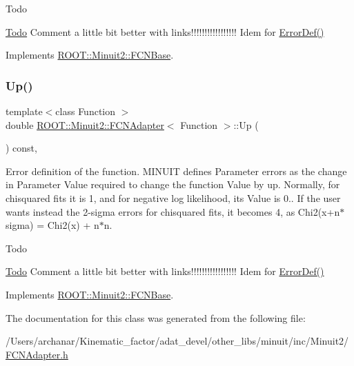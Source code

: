 \begin{DoxyRefDesc}{Todo}
\item[\mbox{\hyperlink{todo__todo000001}{Todo}}]Comment a little bit better with links!!!!!!!!!!!!!!!!! Idem for \mbox{\hyperlink{classROOT_1_1Minuit2_1_1FCNBase_ac4592475c58a65b037ba97ab5f3cba10}{Error\+Def()}}\end{DoxyRefDesc}


Implements \mbox{\hyperlink{classROOT_1_1Minuit2_1_1FCNBase_a04ef08ddad92ce8d89d498efbe021c39}{R\+O\+O\+T\+::\+Minuit2\+::\+F\+C\+N\+Base}}.

\mbox{\label{classROOT_1_1Minuit2_1_1FCNAdapter_a3bcb29efda3b97c17bb17512c1629365}} 
\subsubsection{\texorpdfstring{Up()}{Up()}\hspace{0.1cm}{\footnotesize\ttfamily [2/2]}}
{\footnotesize\ttfamily template$<$class Function $>$ \\
double \mbox{\hyperlink{classROOT_1_1Minuit2_1_1FCNAdapter}{R\+O\+O\+T\+::\+Minuit2\+::\+F\+C\+N\+Adapter}}$<$ Function $>$\+::Up (\begin{DoxyParamCaption}{ }\end{DoxyParamCaption}) const\hspace{0.3cm}{\ttfamily [inline]}, {\ttfamily [virtual]}}

Error definition of the function. M\+I\+N\+U\+IT defines Parameter errors as the change in Parameter Value required to change the function Value by up. Normally, for chisquared fits it is 1, and for negative log likelihood, its Value is 0.. If the user wants instead the 2-\/sigma errors for chisquared fits, it becomes 4, as Chi2(x+n$\ast$sigma) = Chi2(x) + n$\ast$n.

\begin{DoxyRefDesc}{Todo}
\item[\mbox{\hyperlink{todo__todo000001}{Todo}}]Comment a little bit better with links!!!!!!!!!!!!!!!!! Idem for \mbox{\hyperlink{classROOT_1_1Minuit2_1_1FCNBase_ac4592475c58a65b037ba97ab5f3cba10}{Error\+Def()}}\end{DoxyRefDesc}


Implements \mbox{\hyperlink{classROOT_1_1Minuit2_1_1FCNBase_a04ef08ddad92ce8d89d498efbe021c39}{R\+O\+O\+T\+::\+Minuit2\+::\+F\+C\+N\+Base}}.



The documentation for this class was generated from the following file\+:\begin{DoxyCompactItemize}
\item 
/\+Users/archanar/\+Kinematic\+\_\+factor/adat\+\_\+devel/other\+\_\+libs/minuit/inc/\+Minuit2/\mbox{\hyperlink{other__libs_2minuit_2inc_2Minuit2_2FCNAdapter_8h}{F\+C\+N\+Adapter.\+h}}\end{DoxyCompactItemize}

